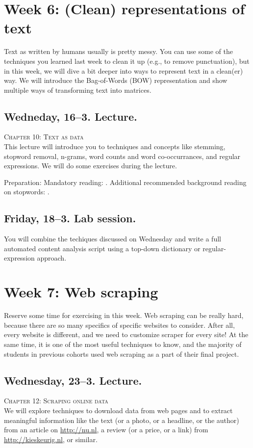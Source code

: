 \section*{Week 6: (Clean) representations of text}
Text as written by humans usually is pretty messy. You can use some of the techniques you learned last week to clean it up (e.g., to remove punctuation), but in this week, we will dive a bit deeper into ways to represent text in a clean(er) way. We will introduce the Bag-of-Words (BOW) representation and show multiple ways of transforming text into matrices.



\subsection*{Wedneday, 16--3. Lecture.}
\textsc{ Chapter 10: Text as data}\\
This lecture will introduce you to techniques and concepts like stemming, stopword removal, n-grams, word counts and word co-occurrances, and regular expressions. We will do some exercises during the lecture.

Preparation: Mandatory reading: \cite{Boumans2016}. Additional recommended background reading on stopwords: \cite{Nothman2018}.


\subsection*{Friday, 18--3. Lab session.}
You will combine the techiques discussed on Wednesday and write a full automated content analysis script using a top-down dictionary or regular-expression approach.





\section*{Week 7: Web scraping}
Reserve some time for exercising in this week. Web scraping can be really hard, because there are so many specifics of specific websites to consider. After all, every website is different, and we need to customize scraper for every site! At the same time, it is one of the most useful techniques to know, and the majority of students in previous cohorts used web scraping as a part of their final project.


\subsection*{Wednesday, 23--3. Lecture.}
\textsc{ Chapter 12: Scraping online data}\\
We will explore techniques to download data from web pages and to extract meaningful information like the text (or a photo, or a headline, or the author) from an article on \url{http://nu.nl}, a review (or a price, or a link) from \url{http://kieskeurig.nl}, or similar.

